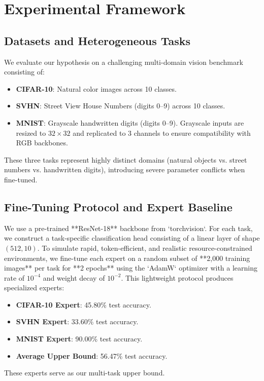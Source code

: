 \documentclass{article}
\begin{document}
\section{Experimental Framework}
\label{sec:experiments}

\subsection{Datasets and Heterogeneous Tasks}
We evaluate our hypothesis on a challenging multi-domain vision benchmark consisting of:
\begin{itemize}
    \item \textbf{CIFAR-10}: Natural color images across 10 classes.
    \item \textbf{SVHN}: Street View House Numbers (digits 0--9) across 10 classes.
    \item \textbf{MNIST}: Grayscale handwritten digits (digits 0--9). Grayscale inputs are resized to $32 \times 32$ and replicated to 3 channels to ensure compatibility with RGB backbones.
\end{itemize}
These three tasks represent highly distinct domains (natural objects vs. street numbers vs. handwritten digits), introducing severe parameter conflicts when fine-tuned.

\subsection{Fine-Tuning Protocol and Expert Baseline}
We use a pre-trained **ResNet-18** backbone from `torchvision`. For each task, we construct a task-specific classification head consisting of a linear layer of shape $(512, 10)$. 
To simulate rapid, token-efficient, and realistic resource-constrained environments, we fine-tune each expert on a random subset of **2,000 training images** per task for **2 epochs** using the `AdamW` optimizer \cite{loshchilov2017decoupled} with a learning rate of $10^{-4}$ and weight decay of $10^{-2}$.
This lightweight protocol produces specialized experts:
\begin{itemize}
    \item \textbf{CIFAR-10 Expert}: 45.80\% test accuracy.
    \item \textbf{SVHN Expert}: 33.60\% test accuracy.
    \item \textbf{MNIST Expert}: 90.00\% test accuracy.
    \item \textbf{Average Upper Bound}: 56.47\% test accuracy.
\end{itemize}
These experts serve as our multi-task upper bound.
\end{document}
